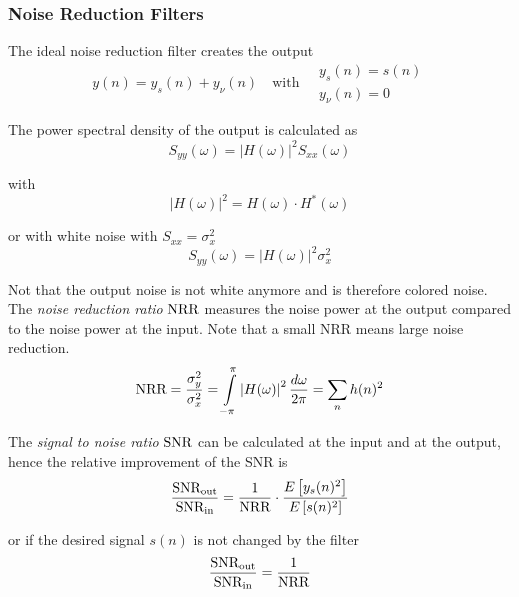 \subsubsection{Noise Reduction Filters}

The ideal noise reduction filter creates the output
\begin{equation*}
	y(n) = y_s(n) + y_{\nu}(n) \quad \text{with} \quad
		\begin{array}{l}
		y_s(n) = s(n) \\
		y_{\nu}(n) = 0
		\end{array}
\end{equation*}

The power spectral density of the output is calculated as
\begin{equation*}
	S_{yy}(\omega) = \left| H(\omega) \right|^2 S_{xx}(\omega)
\end{equation*}

with
\begin{equation*}
	\left| H(\omega) \right|^2 = H(\omega) \cdot H^*(\omega)
\end{equation*}

or with white noise with $S_{xx} = \sigma_x^2$
\begin{equation*}
	S_{yy}(\omega) = \left| H(\omega) \right|^2 \sigma_x^2
\end{equation*}

Not that the output noise is not white anymore and is therefore colored noise. \\

The \emph{noise reduction ratio} $\operatorname{\text{NRR}}$ measures the noise power at the output
compared to the noise power at the input. Note that a small NRR means 
large noise reduction.
\begin{equation*}
	\operatorname{\text{NRR}} = \frac{\sigma_y^2}{\sigma_x^2} 
		 = \int\limits_{-\pi}^{\pi} \left| H(\omega) \right|^2 \frac{d\omega}{2\pi}
		 = \sum\limits_{n} h(n)^2
\end{equation*}

The \emph{signal to noise ratio} $\operatorname{\text{SNR}}$ can be calculated at the input and
at the output, hence the relative improvement of the SNR is
\begin{equation*}
	\frac{\operatorname{\text{SNR}}_{\text{out}}}{\operatorname{\text{SNR}}_{\text{in}}} = \frac{1}{\operatorname{\text{NRR}}} \cdot \frac{E\left[y_s(n)^2\right]}{E\left[s(n)^2\right]}
\end{equation*}

or if the desired signal $s(n)$ is not changed by the filter
\begin{equation*}
	\frac{\operatorname{\text{SNR}}_{\text{out}}}{\operatorname{\text{SNR}}_{\text{in}}} = \frac{1}{\operatorname{\text{NRR}}}
\end{equation*}


